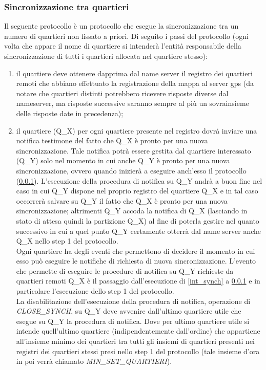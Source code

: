 \subsubsection{Sincronizzazione tra quartieri}
\label{quart_synch}
Il seguente protocollo è un protocollo che esegue la sincronizzazione tra un numero di quartieri non fissato a priori. Di seguito i passi del protocollo (ogni volta che appare il nome di quartiere si intenderà l'entità responsabile della sincronizzazione di tutti i quartieri allocata nel quartiere stesso):
\begin{enumerate}
\item il quartiere deve ottenere dapprima dal name server il registro dei quartieri remoti che abbiano effettuato la registrazione della mappa al server gps (da notare che quartieri distinti potrebbero ricevere risposte diverse dal nameserver, ma risposte successive saranno sempre al più un sovrainsieme delle risposte date in precedenza);
\item il quartiere (Q\_X) per ogni quartiere presente nel registro dovrà inviare una notifica testimone del fatto che Q\_X è pronto per una nuova sincronizzazione. Tale notifica potrà essere gestita dal quartiere interessato (Q\_Y) solo nel momento in cui anche Q\_Y è pronto per una nuova sincronizzazione, ovvero quando inizierà a eseguire anch'esso il protocollo (\ref{quart_synch}). L'esecuzione della procedura di notifica su Q\_Y andrà a buon fine nel caso in cui Q\_Y dispone nel proprio registro del quartiere Q\_X e in tal caso occorrerà salvare su Q\_Y il fatto che Q\_X è pronto per una nuova sincronizzazione; altrimenti Q\_Y accoda la notifica di Q\_X (lasciando in stato di attesa quindi la partizione Q\_X) al fine di poterla gestire nel quanto successivo in cui a quel punto Q\_Y certamente otterrà dal name server anche Q\_X nello step 1 del protocollo. \\
Ogni quartiere ha degli eventi che permettono di decidere il momento in cui esso può eseguire le notifiche di richiesta di nuova sincronizzazione. L'evento che permette di eseguire le procedure di notifica su Q\_Y richieste da quartieri remoti Q\_X è il passaggio dall'esecuzione di \ref{int_synch} a \ref{quart_synch} e in particolare l'esecuzione dello step 1 del protocollo. \\ La disabilitazione dell'esecuzione della procedura di notifica, operazione di \textit{CLOSE\_SYNCH}, su Q\_Y deve avvenire dall'ultimo quartiere utile che esegue su Q\_Y la procedura di notifica. Dove per ultimo quartiere utile si intende quell'ultimo quartiere (indipendentemente dall'ordine) che appartiene all'insieme minimo dei quartieri tra tutti gli insiemi di quartieri presenti nei registri dei quartieri stessi presi nello step 1 del protocollo (tale insieme d'ora in poi verrà chiamato \textit{MIN\_SET\_QUARTIERI}). \\

\end{enumerate}
